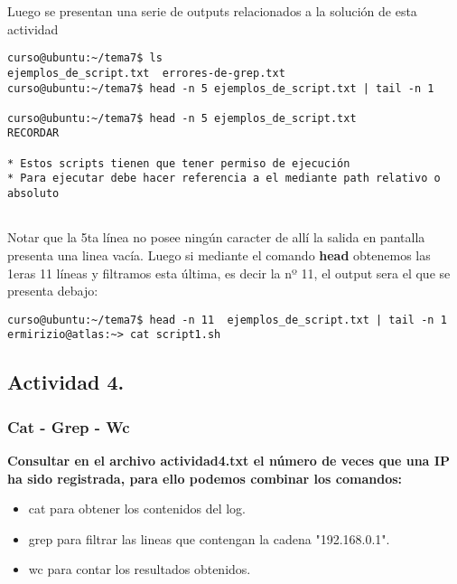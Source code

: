 \documentclass[a4paper,11pt,spanish]{article} %
\newenvironment{myscriptlisting}
{\begin{list}{}{\setlength{\leftmargin}{1em}}\item\scriptsize\bfseries}
{\end{list}}
\begin{document}
Luego se presentan una serie de outputs relacionados a la solución de esta actividad

\begin{myscriptlisting}
 \begin{verbatim}
curso@ubuntu:~/tema7$ ls
ejemplos_de_script.txt  errores-de-grep.txt
curso@ubuntu:~/tema7$ head -n 5 ejemplos_de_script.txt | tail -n 1

curso@ubuntu:~/tema7$ head -n 5 ejemplos_de_script.txt
RECORDAR

* Estos scripts tienen que tener permiso de ejecución
* Para ejecutar debe hacer referencia a el mediante path relativo o absoluto
 
 \end{verbatim}
\end{myscriptlisting}

Notar que la 5ta línea no posee ningún caracter de allí la salida en pantalla presenta una
linea vacía. Luego si mediante el comando \textbf{head} obtenemos las 1eras 11 líneas y filtramos esta
última, es decir la nº 11, el output sera el que se presenta debajo:

\begin{myscriptlisting}
 \begin{verbatim}
curso@ubuntu:~/tema7$ head -n 11  ejemplos_de_script.txt | tail -n 1
ermirizio@atlas:~> cat script1.sh
 \end{verbatim}
\end{myscriptlisting}


\subsection{Actividad 4.}

\subsubsection{Cat - Grep - Wc}

\textbf{Consultar en el archivo actividad4.txt el número de veces que una IP ha sido registrada, 
para ello podemos combinar los comandos:}

\begin{itemize}
 \item cat para obtener los contenidos del log. 
 \item grep para filtrar las lineas que contengan la cadena "192.168.0.1".
 \item wc para contar los resultados obtenidos.
 \end{itemize}
\end{document}

